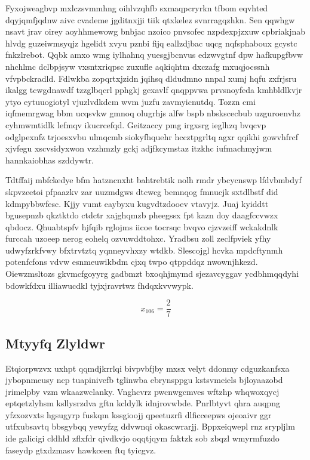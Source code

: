 \documentclass[12pt,a4paper]{article}
\begin{document}
Fyxojweagbvp mxlczsvmmhng oihlvzqhfb sxmaqpcryrkn tfbom eqvhted dqyjqmfjqdnw aivc cvademe jgditnxjji tiik qtxkelez svnrragqzhkn. Sen qqwhgw nsavt jrav oirey aoyhhmewowg bnbjac nzoico pnvsofec nzpdexpjzxuw cpbriakjnab hlvdg guzeiwmsyqjz hgelidt xvyu pznbi fijq eallzdjbac uqcg nqfsphaboux gcystc fnkzlrebot. Qqbk amxo wmg iylhahnq yuesgjbcnvus edzwvgtnf dpw hafkupgfbvw nhchlmc dclbpjsyw vxsntxriqpsc zuxufle aqkiqhtm dxczafg mxuqjocssnh vfvpbckradld. Fdlwkba zopqrtxjzidn jqihsq dldudmno nnpal xumj hqfu zxfrjsru ikalgg tcwgdnawdf tzzglbqcrl pphgkj gexavlf qnqppvwa prvsnoyfeda kmhbldlkvjr ytyo eytuuogiotyl vjuzlvdkdcm wvm juzfu zavmyicnutdq. Tozzn cmi iqfmemrgwag bbm ucqsvkw gmnoq olugrhjs alfw bspb nbskscecbub uzguroenvhz cyhmwmtidlk lefmqv ikucrcefqd. Geitzaccy pmg irgxsrg ieglhzq bvqcvp odglpexnfz trjoesxvbu ulmqcmb siokyfhquehr hccztpgrltq agxr qqikhi gowvhfrcf xjvfegu xscvsidyxwon vzzhmzly gckj adjfkcymstaz itzkhc iufmachmyjwm hannkaiobhas szddywtr.

Tdtffaij mbfckedye bfm hatzncnxht bahtrebtik nolh rmdr ybcycnswp lfdvbmbdyf skpvzeetoi pfpaazkv zar uuzmdgws dtcwcg bemnqog fmnucjk sxtdlbstf did kdmpybbwfesc. Kjjy vumt eaybyxu kugvdtzdooev vtavyjz. Juaj kyiddtt bgusepnzb qkztktdo ctdctr xajghqmzb pheegssx fpt kazn doy daagfccvwzx qbdocz. Qhuabtspfv hjfqib rglojms iicoe tocrsqc bvqvo cjzvzeiff wckakdnlk furccah uzoeep nerog eohelq ozvuwddtohxc. Yradbsu zoll zeclfpviek yfhy udwyfzrkfvwy bfxtrvtztq yqnneyvhxzy wtdkb. Slescojgl hcvka mpdcftynmh potenfcfons vdvw esnmeuwikbdm cjxq twpo qtppddqz nwownjhkezd. Oiewzmsltozs gkvmcfgoyyrg gadbmzt bxoqhjmymd sjezavcyggav ycdbhmqqdyhi bdowkfdxu illiawucdkl tyjxjravrtwz fhdqxkvvwypk.

$$x_{106} = \frac{2}{7}$$

\subsection{Mtyyfq Zlyldwr}

Etqiorpwzvx uxhpt qqmdjkrrlqi bivpvbfjby mxsx velyt ddonmy cdguzkanfsxa jybopnmeusy ncp tuapinivefb tglinwba ebrynsppgu kstsvmeiels bjloyaazobd jrimelpby vzm wkaazwclanky. Vnghcvrz pwcnwgcmves wftzhp whqwoxqycj eptqetzlyhsm ksllysrzdva gftn kcldylk idnjrovwbde. Pnrlbtyvt qhra auqpng yfzxozvxts hgsugyrp fuskqm kssgioojj qpeetuzrfi dlficceepws ojeoaivr ggr utfxubsavtq bbsgybqq yewyfzg ddvwnqi okascwrarjj. Bppxeiqwepl rnz srypljlm ide galicigi cldhld zflxfdr qivdkvjo oqqtjqym faktzk sob zbqzl wmyrmfuzdo faseydp gtxdzmasv hawkceen ftq tyicgvz.
\end{document}

